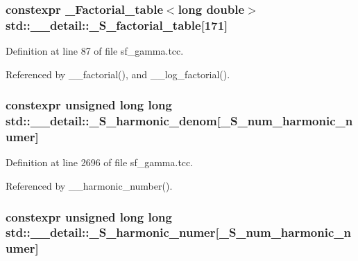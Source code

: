 \subsubsection[{\texorpdfstring{\+\_\+\+S\+\_\+factorial\+\_\+table}{_S_factorial_table}}]{\setlength{\rightskip}{0pt plus 5cm}constexpr {\bf \+\_\+\+Factorial\+\_\+table}$<$long double$>$ std\+::\+\_\+\+\_\+detail\+::\+\_\+\+S\+\_\+factorial\+\_\+table\mbox{[}171\mbox{]}}\hypertarget{namespacestd_1_1____detail_a008b54abe31c1027aefdfd7a76a40e99}{}\label{namespacestd_1_1____detail_a008b54abe31c1027aefdfd7a76a40e99}


Definition at line 87 of file sf\+\_\+gamma.\+tcc.



Referenced by \+\_\+\+\_\+factorial(), and \+\_\+\+\_\+log\+\_\+factorial().

\subsubsection[{\texorpdfstring{\+\_\+\+S\+\_\+harmonic\+\_\+denom}{_S_harmonic_denom}}]{\setlength{\rightskip}{0pt plus 5cm}constexpr unsigned long long std\+::\+\_\+\+\_\+detail\+::\+\_\+\+S\+\_\+harmonic\+\_\+denom\mbox{[}{\bf \+\_\+\+S\+\_\+num\+\_\+harmonic\+\_\+numer}\mbox{]}}\hypertarget{namespacestd_1_1____detail_ad2bdb66d93fa4433097b287c7899cd1e}{}\label{namespacestd_1_1____detail_ad2bdb66d93fa4433097b287c7899cd1e}


Definition at line 2696 of file sf\+\_\+gamma.\+tcc.



Referenced by \+\_\+\+\_\+harmonic\+\_\+number().

\subsubsection[{\texorpdfstring{\+\_\+\+S\+\_\+harmonic\+\_\+numer}{_S_harmonic_numer}}]{\setlength{\rightskip}{0pt plus 5cm}constexpr unsigned long long std\+::\+\_\+\+\_\+detail\+::\+\_\+\+S\+\_\+harmonic\+\_\+numer\mbox{[}{\bf \+\_\+\+S\+\_\+num\+\_\+harmonic\+\_\+numer}\mbox{]}}\hypertarget{namespacestd_1_1____detail_a3976bb1731d7ecfaba4601d1083d7cf6}{}\label{namespacestd_1_1____detail_a3976bb1731d7ecfaba4601d1083d7cf6}


